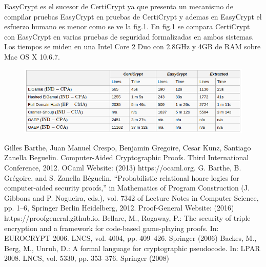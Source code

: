 \documentclass[runningheads]{llncs}
\begin{document}
EasyCrypt es el sucesor de CertiCrypt ya que presenta un mecanismo de compilar pruebas EasyCrypt en pruebas de CertiCrypt y ademas en EasyCrypt el esfuerzo humano es menor como se ve la fig.1. En fig.1 se compara CertiCrypt con EasyCrypt en varias pruebas de seguridad formalizadas en ambos sistemas. Los tiempos se miden en una Intel Core 2 Duo con 2.8GHz y 4GB de RAM sobre Mac OS X 10.6.7.
\begin{figure}
  \centering
  \includegraphics[width=.8\textwidth]{tabla_1}
  \caption{}
  \label{fig:simple}
\end{figure}
\begin{thebibliography}{8}
Gilles Barthe, Juan Manuel Crespo, Benjamin Gregoire, Cesar Kunz, Santiago Zanella Beguelin. Computer-Aided Cryptographic Proofs. Third International Conference, 2012.
OCaml Website: (2013) https://ocaml.org.
G. Barthe, B. Grégoire, and S. Zanella Béguelin, “Probabilistic relational hoare
logics for computer-aided security proofs,” in Mathematics of Program Construction
(J. Gibbons and P. Nogueira, eds.), vol. 7342 of Lecture Notes in
Computer Science, pp. 1–6, Springer Berlin Heidelberg, 2012.
Proof-General Website: (2016) https://proofgeneral.github.io.
Bellare, M., Rogaway, P.: The security of triple encryption and a framework for
code-based game-playing proofs. In: EUROCRYPT 2006. LNCS, vol. 4004, pp.
409–426. Springer (2006)
Backes, M., Berg, M., Unruh, D.: A formal language for cryptographic pseudocode.
In: LPAR 2008. LNCS, vol. 5330, pp. 353–376. Springer (2008)


\end{thebibliography}
\end{document}
